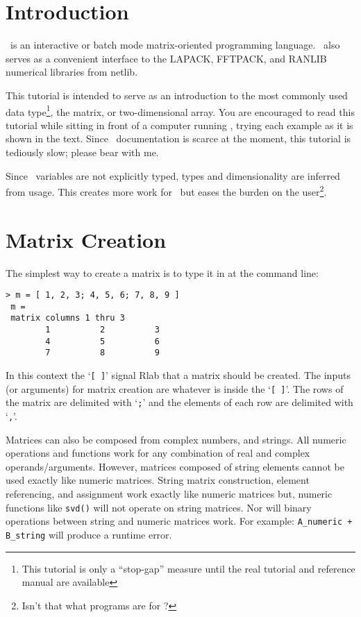 \section{Introduction}

   \RLaB\ is an interactive or batch mode matrix-oriented programming
   language. \RLaB\ also serves as a convenient interface to the
   LAPACK, FFTPACK, and RANLIB numerical libraries from netlib.

   This tutorial is intended to serve as an introduction to the most
   commonly used data type\footnote{This tutorial is only a
   ``stop-gap'' measure until the real tutorial and reference manual
   are available}, the matrix, or two-dimensional array. You are
   encouraged to read this tutorial while sitting in front of a
   computer running \RLaB , trying each example as it is shown in the
   text. Since \RLaB\ documentation is scarce at the moment, this
   tutorial is tediously slow; please bear with me.
   
   Since \RLaB\ variables are not explicitly typed, types and
   dimensionality are inferred from usage. This creates more work for
   \RLaB\, but eases the burden on the user\footnote{Isn't that what
   programs are for ?}.

\section{Matrix Creation}

   The simplest way to create a matrix is to type it in at the command
   line: 

\begin{verbatim}
> m = [ 1, 2, 3; 4, 5, 6; 7, 8, 9 ]
 m =
 matrix columns 1 thru 3
        1          2          3  
        4          5          6  
        7          8          9  
\end{verbatim}

   In this context the `\verb+[ ]+' signal Rlab that a matrix should
   be created. The inputs (or arguments) for matrix creation are
   whatever is inside the `\verb+[ ]+'. The rows of the matrix are
   delimited with `\verb+;+' and the elements of each row are
   delimited with `\verb+,+'.

   Matrices can also be composed from complex numbers, and strings.
   All numeric operations and functions work for any combination of
   real and complex operands/arguments. However, matrices composed of
   string elements cannot be used exactly like numeric matrices.
   String matrix construction, element referencing, and assignment
   work exactly like numeric matrices but, numeric functions like
   \verb+svd()+ will not operate on string matrices. Nor will binary
   operations between string and numeric matrices work. For example:
   \verb|A_numeric + B_string| will produce a runtime error.

